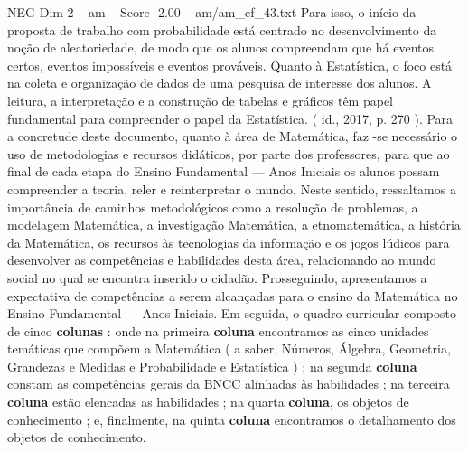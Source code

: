 \begin{textsample}{NEG Dim 2 – am – Score -2.00 – am/am\_ef\_43.txt}
Para isso, o início da proposta de trabalho com probabilidade está centrado no desenvolvimento da noção de aleatoriedade, de modo que os alunos compreendam que há eventos certos, eventos impossíveis e eventos prováveis.
Quanto à Estatística, o foco está na coleta e organização de dados de uma pesquisa de interesse dos alunos.
A leitura, a interpretação e a construção de tabelas e gráficos têm papel fundamental para compreender o papel da Estatística. ( id., 2017, p. 270 ).
Para a concretude deste documento, quanto à área de Matemática, faz -se necessário o uso de metodologias e recursos didáticos, por parte dos professores, para que ao final de cada etapa do Ensino Fundamental — Anos Iniciais os alunos possam compreender a teoria, reler e reinterpretar o mundo.
Neste sentido, ressaltamos a importância de caminhos metodológicos como a resolução de problemas, a modelagem Matemática, a investigação Matemática, a etnomatemática, a história da Matemática, os recursos às tecnologias da informação e os jogos lúdicos para desenvolver as competências e habilidades desta área, relacionando ao mundo social no qual se encontra inserido o cidadão.
Prosseguindo, apresentamos a expectativa de competências a serem alcançadas para o ensino da Matemática no Ensino Fundamental — Anos Iniciais.
Em seguida, o quadro curricular composto de cinco \textbf{colunas} : onde na primeira \textbf{coluna} encontramos as cinco unidades temáticas que compõem a Matemática ( a saber, Números, Álgebra, Geometria, Grandezas e Medidas e Probabilidade e Estatística ) ; na segunda \textbf{coluna} constam as competências gerais da BNCC alinhadas às habilidades ; na terceira \textbf{coluna} estão elencadas as habilidades ; na quarta \textbf{coluna}, os objetos de conhecimento ; e, finalmente, na quinta \textbf{coluna} encontramos o detalhamento dos objetos de conhecimento.

\end{textsample}
